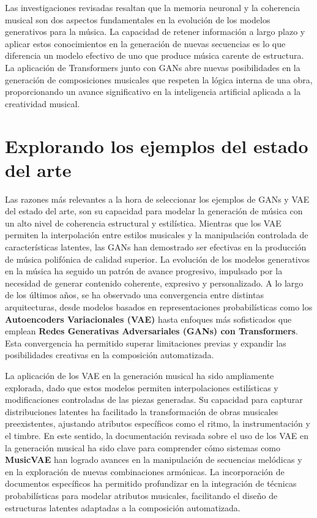 Las investigaciones revisadas resaltan que la memoria neuronal y la coherencia musical son dos aspectos fundamentales en la evolución de los modelos generativos para la música. La capacidad de retener información a largo plazo y aplicar estos conocimientos en la generación de nuevas secuencias es lo que diferencia un modelo efectivo de uno que produce música carente de estructura. La aplicación de Transformers junto con GANs abre nuevas posibilidades en la generación de composiciones musicales que respeten la lógica interna de una obra, proporcionando un avance significativo en la inteligencia artificial aplicada a la creatividad musical.


\section{Explorando los ejemplos del estado del arte}

Las razones más relevantes a la hora de seleccionar los ejemplos de GANs y VAE del estado del arte, son su capacidad para modelar la generación de música con un alto nivel de coherencia estructural y estilística. Mientras que los VAE permiten la interpolación entre estilos musicales y la manipulación controlada de características latentes, las GANs han demostrado ser efectivas en la producción de música polifónica de calidad superior. La evolución de los modelos generativos en la música ha seguido un patrón de avance progresivo, impulsado por la necesidad de generar contenido coherente, expresivo y personalizado. A lo largo de los últimos años, se ha observado una convergencia entre distintas arquitecturas, desde modelos basados en representaciones probabilísticas como los \textbf{Autoencoders Variacionales (VAE)} hasta enfoques más sofisticados que emplean \textbf{Redes Generativas Adversariales (GANs) con Transformers}. Esta convergencia ha permitido superar limitaciones previas y expandir las posibilidades creativas en la composición automatizada.

La aplicación de los VAE en la generación musical ha sido ampliamente explorada, dado que estos modelos permiten interpolaciones estilísticas y modificaciones controladas de las piezas generadas. Su capacidad para capturar distribuciones latentes ha facilitado la transformación de obras musicales preexistentes, ajustando atributos específicos como el ritmo, la instrumentación y el timbre. En este sentido, la documentación revisada sobre el uso de los VAE en la generación musical ha sido clave para comprender cómo sistemas como \textbf{MusicVAE} han logrado avances en la manipulación de secuencias melódicas y en la exploración de nuevas combinaciones armónicas. La incorporación de documentos específicos ha permitido profundizar en la integración de técnicas probabilísticas para modelar atributos musicales, facilitando el diseño de estructuras latentes adaptadas a la composición automatizada.

